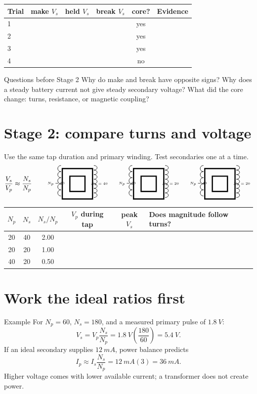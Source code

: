 \begin{center}\small
\begin{tabularx}{\linewidth}{@{}lCCCCL@{}}
\toprule
Trial & make \(V_s\) & held \(V_s\) & break \(V_s\) & core? & Evidence\\
 & & & & yes & \\
2 & & & & yes & \\
3 & & & & yes & \\
4 & & & & no & \\
\bottomrule
\end{tabularx}
\end{center}

\begin{teloscard}{Questions before Stage 2}
Why do make and break have opposite signs? Why does a steady battery current
not give steady secondary voltage? What did the core change: turns, resistance,
or magnetic coupling?
\end{teloscard}

\section{Stage 2: compare turns and voltage}
Use the same tap duration and primary winding. Test secondaries one at a time.
\[
\frac{V_s}{V_p}\approx\frac{N_s}{N_p}
\qquad
\coilpair{20}{40}\quad
\coilpair{20}{20}\quad
\coilpair{40}{20}
\]

\begin{center}\small
\begin{tabularx}{\linewidth}{@{}CCCCC L@{}}
\toprule
\(N_p\) & \(N_s\) & \(N_s/N_p\) & \(V_p\) during tap & peak \(V_s\) &
Does magnitude follow turns?\\
 & 40 & 2.00 & & &\\
20 & 20 & 1.00 & & &\\
40 & 20 & 0.50 & & &\\
\bottomrule
\end{tabularx}
\end{center}

\newpage
{}
\section{Work the ideal ratios first}
\begin{teloscard}{Example}
For \(N_p=60\), \(N_s=180\), and a measured primary pulse of
\(\qty{1.8}{V}\):
\[
V_s=V_p\frac{N_s}{N_p}
=\qty{1.8}{V}\left(\frac{180}{60}\right)=\qty{5.4}{V}.
\]
If an ideal secondary supplies \(\qty{12}{mA}\), power balance predicts
\[
I_p\approx I_s\frac{N_s}{N_p}
=\qty{12}{mA}(3)=\qty{36}{mA}.
\]
Higher voltage comes with lower available current; a transformer does not
create power.
\end{teloscard}


